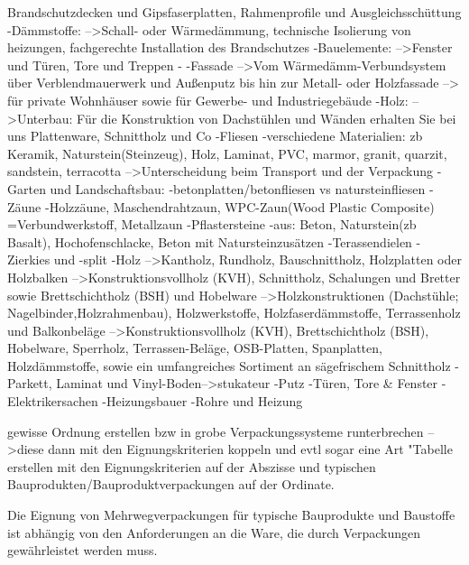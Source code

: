         
        Brandschutzdecken und Gipsfaserplatten, Rahmenprofile und Ausgleichsschüttung
        -Dämmstoffe:
            -->Schall- oder Wärmedämmung, technische Isolierung von heizungen, fachgerechte Installation des Brandschutzes
        -Bauelemente:
            -->Fenster und Türen, Tore und Treppen
        -                    -Fassade
                        -->Vom Wärmedämm-Verbundsystem über Verblendmauerwerk und Außenputz bis hin zur Metall- oder Holzfassade
                        --> für private Wohnhäuser sowie für Gewerbe- und Industriegebäude
                    -Holz:
                        -->Unterbau: Für die Konstruktion von Dachstühlen und Wänden erhalten Sie bei uns Plattenware, Schnittholz und Co
        -Fliesen
            -verschiedene Materialien: zb Keramik, Naturstein(Steinzeug), Holz, Laminat, PVC, marmor, granit, quarzit, sandstein, terracotta
                -->Unterscheidung beim Transport und der Verpackung
        -Garten und Landschaftsbau:
            -betonplatten/betonfliesen vs natursteinfliesen
            -Zäune
                -Holzzäune, Maschendrahtzaun, WPC-Zaun(Wood Plastic Composite) =Verbundwerkstoff, Metallzaun
            -Pflastersteine
                -aus: Beton, Naturstein(zb Basalt), Hochofenschlacke, Beton mit Natursteinzusätzen
            -Terassendielen
        -Zierkies und -split
        -Holz
            -->Kantholz, Rundholz, Bauschnittholz, Holzplatten oder Holzbalken           -->Konstruktionsvollholz (KVH), Schnittholz, Schalungen und Bretter sowie Brettschichtholz (BSH) und Hobelware
            -->Holzkonstruktionen (Dachstühle; Nagelbinder,Holzrahmenbau), Holzwerkstoffe, Holzfaserdämmstoffe, Terrassenholz und Balkonbeläge
            -->Konstruktionsvollholz (KVH), Brettschichtholz (BSH), Hobelware, Sperrholz, Terrassen-Beläge, OSB-Platten, Spanplatten,  Holzdämmstoffe, sowie ein umfangreiches Sortiment an sägefrischem Schnittholz
        -Parkett, Laminat und Vinyl-Boden-->stukateur
        -Putz
        -Türen, Tore \& Fenster
        -Elektrikersachen
        -Heizungsbauer
            -Rohre und Heizung
        

    

gewisse Ordnung erstellen bzw in grobe Verpackungssysteme runterbrechen
    -->diese dann mit den Eignungskriterien koppeln und evtl sogar eine Art "Tabelle erstellen mit den Eignungskriterien auf der Abszisse und typischen Bauprodukten/Bauproduktverpackungen auf der Ordinate.
        
    
Die Eignung von Mehrwegverpackungen für typische Bauprodukte und Baustoffe ist abhängig von den Anforderungen an die Ware, die durch Verpackungen gewährleistet werden muss.

